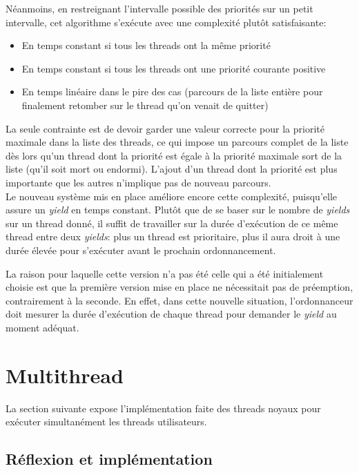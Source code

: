 \documentclass[a4paper,11pt]{article}
\begin{document}
Néanmoins, en restreignant l'intervalle possible des priorités sur un petit intervalle, cet algorithme s'exécute avec une complexité plutôt satisfaisante:
\begin{itemize}
 \item En temps constant si tous les threads ont la même priorité
 \item En temps constant si tous les threads ont une priorité courante positive
 \item En temps linéaire dans le pire des cas (parcours de la liste entière pour finalement retomber sur le thread qu'on venait de quitter)
\end{itemize}

La seule contrainte est de devoir garder une valeur correcte pour la priorité maximale dans la liste des threads, ce qui impose un parcours complet de la liste dès lors qu'un thread dont la priorité est égale à la priorité maximale sort de la liste (qu'il soit mort ou endormi). L'ajout d'un thread dont la priorité est plus importante que les autres n'implique pas de nouveau parcours.\\

Le nouveau système mis en place améliore encore cette complexité, puisqu'elle assure un \textit{yield} en temps constant. Plutôt que de se baser sur le nombre de \textit{yields} sur un thread donné, il suffit de travailler sur la durée d'exécution de ce même thread entre deux \textit{yields}: plus un thread est prioritaire, plus il aura droit à une durée élevée pour s'exécuter avant le prochain ordonnancement.

La raison pour laquelle cette version n'a pas été celle qui a été initialement choisie est que la première version mise en place ne nécessitait pas de préemption, contrairement à la seconde. En effet, dans cette nouvelle situation, l'ordonnanceur doit mesurer la durée d'exécution de chaque thread pour demander le \textit{yield} au moment adéquat.


\section{Multithread}

La section suivante expose l'implémentation faite des threads noyaux pour exécuter simultanément les threads utilisateurs.

\subsection{Réflexion et implémentation}
\end{document}
